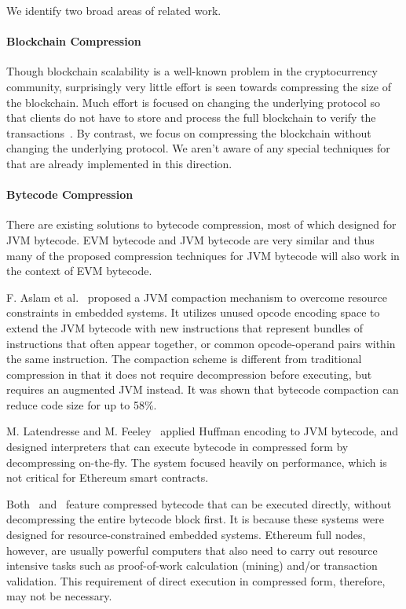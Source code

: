We identify two broad areas of related work.

\paragraph{Blockchain Compression}
Though blockchain scalability is a well-known problem in the cryptocurrency community,
surprisingly very little effort is seen towards compressing the size of the blockchain.
Much effort is focused on changing the underlying protocol so that clients
do not have to store and process the full blockchain to verify the transactions~\cite{lightclient, ultimate}.
By contrast, we focus on compressing the blockchain without changing the underlying protocol.
We aren't aware of any special techniques for that are already implemented in this direction.


\paragraph{Bytecode Compression}
There are existing solutions to bytecode compression, most of which designed for JVM bytecode.
EVM bytecode and JVM bytecode are very similar and thus many of the proposed compression techniques for JVM bytecode
will also work in the context of EVM bytecode.

F. Aslam et al.~\cite{aslam2010} proposed a JVM compaction mechanism to overcome resource constraints in embedded systems.
It utilizes unused opcode encoding space to extend the JVM bytecode with new instructions that represent bundles of
instructions that often appear together, or common opcode-operand pairs within the same instruction.
The compaction scheme is different from traditional compression in that it does not require decompression before executing,
but requires an augmented JVM instead. It was shown that bytecode compaction can reduce code size for up to 58\%.

M. Latendresse and M. Feeley~\cite{marc2003} applied Huffman encoding to JVM bytecode, and designed interpreters that
can execute bytecode in compressed form by decompressing on-the-fly.
The system focused heavily on performance, which is not critical for Ethereum smart contracts.

Both~\cite{aslam2010} and~\cite{marc2003} feature compressed bytecode that can be executed directly, without decompressing
the entire bytecode block first. It is because these systems were designed for resource-constrained embedded systems.
Ethereum full nodes, however, are usually powerful computers that also need to carry out resource intensive tasks such as
proof-of-work calculation (mining) and/or transaction validation. This requirement of direct execution in compressed form,
therefore, may not be necessary.

